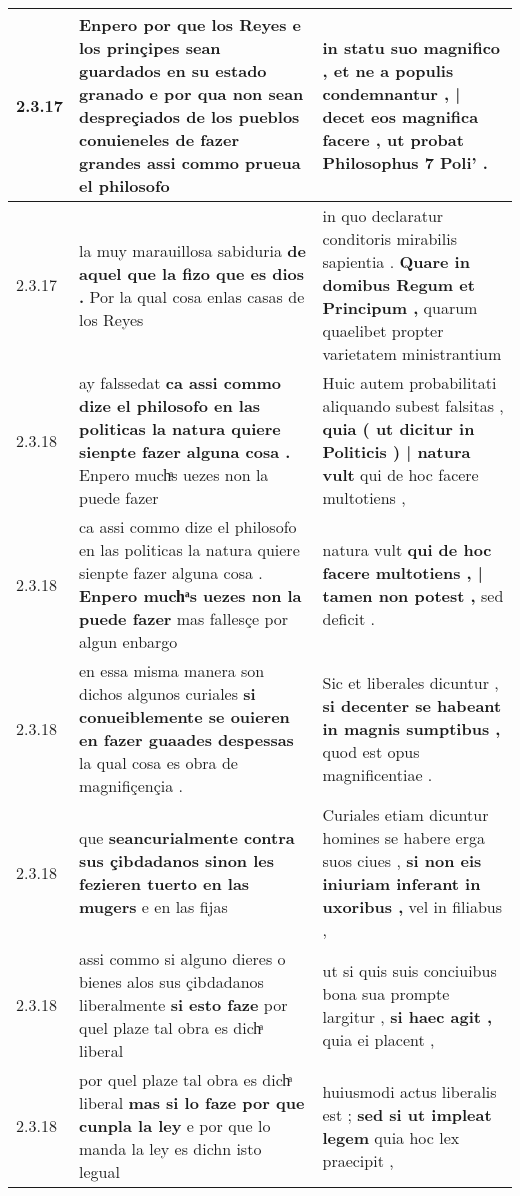 \begin{tabular}{|p{1cm}|p{6.5cm}|p{6.5cm}|}
2.3.17 & Enpero por que los Reyes e los prinçipes sean guardados en su estado granado \textbf{ e por qua non sean despreçiados de los pueblos conuieneles de fazer grandes } assi commo prueua el philosofo & in statu suo magnifico , \textbf{ et ne a populis condemnantur , | decet eos magnifica facere , } ut probat Philosophus 7 Poli’ . \\\hline
2.3.17 & la muy marauillosa sabiduria \textbf{ de aquel que la fizo que es dios . } Por la qual cosa enlas casas de los Reyes & in quo declaratur conditoris mirabilis sapientia . \textbf{ Quare in domibus Regum et Principum , } quarum quaelibet propter varietatem ministrantium \\\hline
2.3.18 & ay falssedat \textbf{ ca assi commo dize el philosofo en las politicas la natura quiere sienpte fazer alguna cosa . } Enpero muchͣs uezes non la puede fazer & Huic autem probabilitati aliquando subest falsitas , \textbf{ quia ( ut dicitur in Politicis ) | natura vult } qui de hoc facere multotiens , \\\hline
2.3.18 & ca assi commo dize el philosofo en las politicas la natura quiere sienpte fazer alguna cosa . \textbf{ Enpero muchͣs uezes non la puede fazer } mas fallesçe por algun enbargo & natura vult \textbf{ qui de hoc facere multotiens , | tamen non potest , } sed deficit . \\\hline
2.3.18 & en essa misma manera son dichos algunos curiales \textbf{ si conueiblemente se ouieren en fazer guaades despessas } la qual cosa es obra de magnifiçençia . & Sic et liberales dicuntur , \textbf{ si decenter se habeant in magnis sumptibus , } quod est opus magnificentiae . \\\hline
2.3.18 & que \textbf{ seancurialmente contra sus çibdadanos sinon les fezieren tuerto en las mugers } e en las fijas & Curiales etiam dicuntur homines se habere erga suos ciues , \textbf{ si non eis iniuriam inferant in uxoribus , } vel in filiabus , \\\hline
2.3.18 & assi commo si alguno dieres o bienes alos sus çibdadanos liberalmente \textbf{ si esto faze } por quel plaze tal obra es dichͣ liberal & ut si quis suis conciuibus bona sua prompte largitur , \textbf{ si haec agit , } quia ei placent , \\\hline
2.3.18 & por quel plaze tal obra es dichͣ liberal \textbf{ mas si lo faze por que cunpla la ley } e por que lo manda la ley es dichn isto legual & huiusmodi actus liberalis est ; \textbf{ sed si ut impleat legem } quia hoc lex praecipit , \\\hline

\end{tabular}
